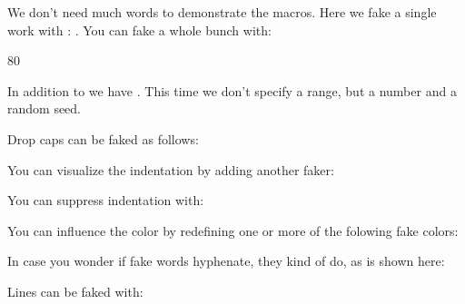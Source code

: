 \starttyping
\usemodule[visual]
\stoptyping

\subject{Faking words}

We don't need much words to demonstrate the macros. Here we fake a single work
with \type {\fakeword}: \fakeword. You can fake a whole bunch with:

\startbuffer
{} \par
{} {80} \par
{}
\stopbuffer

\typebuffer \getbuffer

In addition to \type {\fakewords} we have \type {\fakenwords}. This time we don't
specify a range, but a number and a random seed.

\startbuffer
{} %
\stopbuffer

\typebuffer \getbuffer

Drop caps can be faked as follows:

\startbuffer
{}
 \par
{}
\stopbuffer

\typebuffer \getbuffer

You can visualize the indentation by adding another faker:

\startbuffer
\fakeparindent {}
\stopbuffer

\typebuffer \getbuffer

You can suppress indentation with:

\startbuffer
{}
\stopbuffer

\typebuffer \getbuffer

You can influence the color by redefining one or more of the folowing fake
colors:

\startbuffer
\definecolor[fakerulecolor]     [black]
\definecolor[fakebaselinecolor] [green]
\definecolor[fakeparindentcolor][blue]
\stopbuffer

\typebuffer \getbuffer

In case you wonder if fake words hyphenate, they kind of do, as is shown here:
\bgroup \showfakewords {} \egroup

\subject{Faking lines}

Lines can be faked with:

\startbuffer
{}
\stopbuffer

\typebuffer \getbuffer

